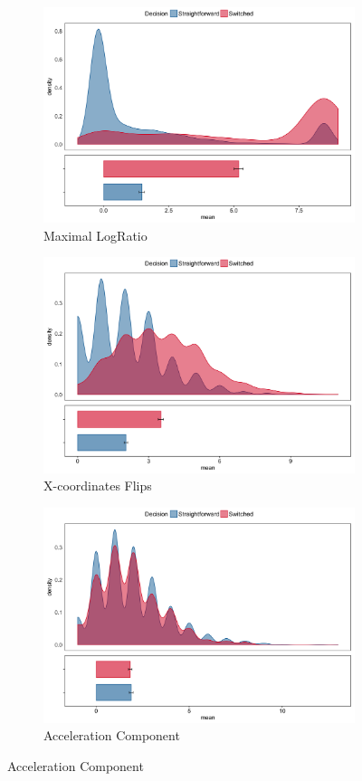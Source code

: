 \documentclass[draft]{article}
\begin{document}
\begin{figure}
%
\begin{subfigure}[b]{0.4\textwidth}
\includegraphics[width=\textwidth]{MaxRatio_calibration.png}
\caption{Maximal LogRatio}
\end{subfigure}
%
\begin{subfigure}[b]{0.4\textwidth}
\includegraphics[width=\textwidth]{Xflips_calibration.png}
\caption{X-coordinates Flips}
\end{subfigure}

\begin{subfigure}[b]{0.4\textwidth}
\includegraphics[width=\textwidth]{AC_calibration.png}
\caption{Acceleration Component}
\end{subfigure}


\end{figure}
\end{document}
